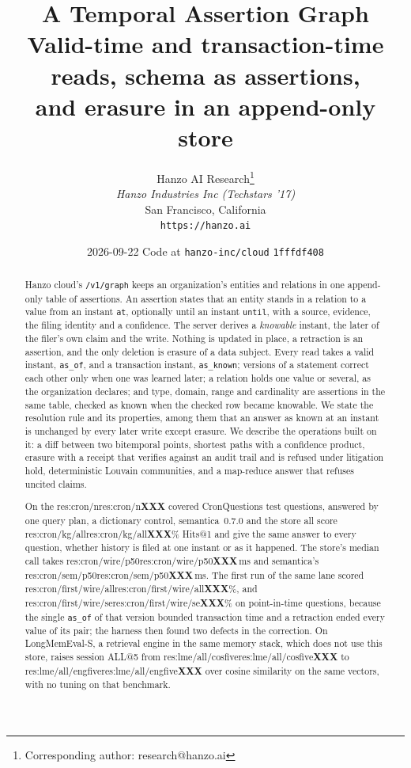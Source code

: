 \documentclass[11pt]{article}
\title{A Temporal Assertion Graph\\[0.35em]
{\large Valid-time and transaction-time reads, schema as assertions,\\
and erasure in an append-only store}}
\author{
    Hanzo AI Research\thanks{Corresponding author: research@hanzo.ai} \\
    \textit{Hanzo Industries Inc (Techstars '17)} \\
    San Francisco, California \\
    \texttt{https://hanzo.ai}
}
\date{2026-09-22 \quad Code at \texttt{hanzo-inc/cloud} \texttt{1fffdf408}}
\newcommand{\ph}{\textbf{XXX}}
\newcommand{\res}[1]{\ifcsname res:#1\endcsname\csname res:#1\endcsname\else\ph\fi}
\theoremstyle{definition}
\theoremstyle{plain}
\theoremstyle{remark}
\begin{document}
\hanzocoverpage
\maketitle

\begin{abstract}
\noindent
Hanzo cloud's \texttt{/v1/graph} keeps an organization's entities and relations
in one append-only table of assertions. An assertion states that an entity
stands in a relation to a value from an instant \texttt{at}, optionally until an
instant \texttt{until}, with a source, evidence, the filing identity and a
confidence. The server derives a \emph{knowable} instant, the later of the
filer's own claim and the write. Nothing is updated in place, a retraction is an
assertion, and the only deletion is erasure of a data subject. Every read takes
a valid instant, \texttt{as\_of}, and a transaction instant,
\texttt{as\_known}; versions of a statement correct each other only when one was
learned later; a relation holds one value or several, as the organization
declares; and type, domain, range and cardinality are assertions in the same
table, checked as known when the checked row became knowable. We state the
resolution rule and its properties, among them that an answer as known at an
instant is unchanged by every later write except erasure. We describe the
operations built on it: a diff between two bitemporal points, shortest paths
with a confidence product, erasure with a receipt that verifies against an
audit trail and is refused under litigation hold, deterministic Louvain
communities, and a map-reduce answer that refuses uncited claims.

On the \res{cron/n} covered CronQuestions test questions, answered by one query
plan, a dictionary control, semantica~0.7.0 and the store all score
\res{cron/kg/all}\% Hits@1 and give the same answer to every question, whether
history is filed at one instant or as it happened. The store's median call takes
\res{cron/wire/p50}\,ms and semantica's \res{cron/sem/p50}\,ms. The first run of
the same lane scored \res{cron/first/wire/all}\%, and \res{cron/first/wire/se}\%
on point-in-time questions, because the single \texttt{as\_of} of that version
bounded transaction time and a retraction ended every value of its pair; the
harness then found two defects in the correction. On LongMemEval-S, a retrieval
engine in the same memory stack, which does not use this store, raises session
ALL@5 from \res{lme/all/cosfive} to \res{lme/all/engfive} over cosine similarity
on the same vectors, with no tuning on that benchmark.
\end{abstract}

\clearpage
\tableofcontents
\clearpage












{\small


}
\end{document}
